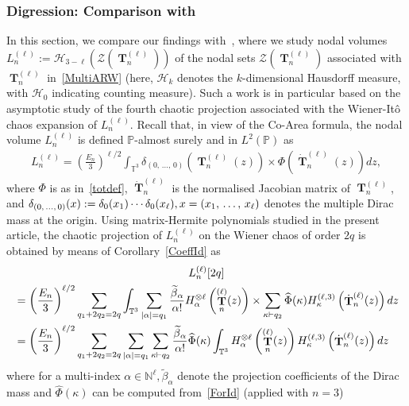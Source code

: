 \documentclass[AHL,Unicode,longabstracts,published]{cedram}
\DeclareMathOperator{\bT}{\mathbf{T}}
\newcommand{\clH}{\mathcal{H}}
\newcommand{\clZ}{\mathcal{Z}}
\newcommand{\N}{\mathbb{N}}
\newcommand{\T}{\mathbb{T}^3}
\newcommand{\Prob}{\mathbb{P}}
\let\oldtilde\tilde
\renewcommand*{\tilde}[1]{\mathchoice{\widetilde{#1}}{\widetilde{#1}}{\oldtilde{#1}}{\oldtilde{#1}}}
\begin{document}
\subsubsection{Digression: Comparison with~\cite{Not20}}\label{Nodal}
In this section, we compare our findings with~\cite{Not20}, where we study nodal volumes $L_n^{(\ell)}:=\clH_{3-\ell}(\clZ(\bT_n^{(\ell)}))$ of the nodal sets $\clZ(\bT_n^{(\ell)})$ associated with $\bT_n^{(\ell)}$ in~\eqref{MultiARW} (here, $\clH_k$ denotes the $k$-dimensional Hausdorff measure, with $\clH_0$ indicating counting measure). Such a work is in particular based on the asymptotic study of the fourth chaotic projection associated with the Wiener-Itô chaos expansion of $L_n^{(\ell)}$. Recall that, in view of the Co-Area formula, the nodal volume $L_n^{(\ell)}$ is defined $\Prob$-almost surely and in $L^2(\Prob)$ as
\begin{gather}\label{VolZ}
L_{n}^{(\ell)}= \left(\frac{E_n}{3}\right)^{\ell/2}\int_{\T}
\delta_{(0,\,\ldots,\,0)}\left(\bT_n^{(\ell)}(z)\right)
\times \Phi\left(\dot{\bT}_n^{(\ell)}(z)\right) dz,
\end{gather}
where $\Phi$ is as in~\eqref{totdef}, $\dot{\bT}_n^{(\ell)}$ is the normalised Jacobian matrix of $\bT_n^{(\ell)}$, and $\delta_{(0,\,\ldots,\,0)}(x)\linebreak:=\delta_0(x_1) \cdots \delta_0(x_{\ell}), x=(x_1,\,\ldots,\,x_{\ell})$ denotes the multiple Dirac mass at the origin. Using matrix-Hermite polynomials studied in the present article, the chaotic projection of $L_n^{(\ell)}$ on the Wiener chaos of order $2q$ is obtained by means of Corollary~\ref{CoeffId} as
\begin{multline}\label{c2q}
L_{n}^{(\ell)}[2q]\\
\begin{aligned}
&= \left(\frac{E_n}{3}\right)^{\ell/2}\sum_{q_1+2q_2=2q} \int_{\T}
\sum_{|\alpha|=q_1} \frac{\tilde{\beta}_{\alpha}}{\alpha!} H_{\alpha}^{\otimes \ell}\left(\bT_n^{(\ell)}(z)\right)
\times \sum_{\kappa \vdash q_2} \widehat{\Phi}(\kappa) H_{\kappa}^{(\ell,3)}\left(\dot{\bT}_n^{(\ell)}(z)\right) dz\\
&= \left(\frac{E_n}{3}\right)^{\ell/2}\sum_{q_1+2q_2=2q}
\sum_{|\alpha|=q_1} \sum_{\kappa \vdash q_2}
\frac{\tilde{\beta}_{\alpha}}{\alpha!}\widehat{\Phi}(\kappa) \int_{\T} H_{\alpha}^{\otimes \ell}\left(\bT_n^{(\ell)}(z)\right) H_{\kappa}^{(\ell,3)}\left(\dot{\bT}_n^{(\ell)}(z)\right) dz 
\end{aligned}
\end{multline}
where for a multi-index $\alpha\in \N^{\ell}, \widetilde{\beta}_{\alpha}$ denote the projection coefficients of the Dirac mass and $\widehat{\Phi}(\kappa)$ can be computed from~\eqref{ForId} (applied with $n=3$)
\end{document}
